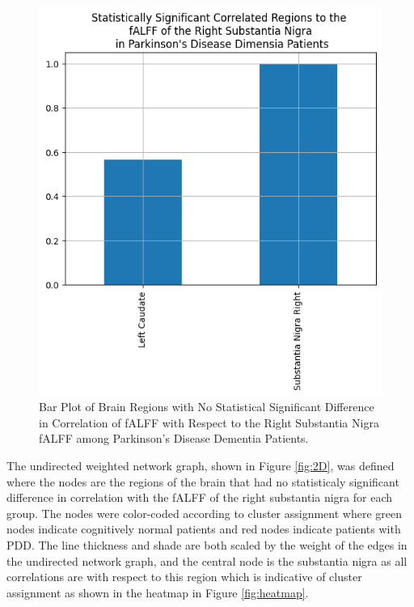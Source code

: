 \documentclass[12pt]{article}
\begin{document}
\begin{figure}[h]  %
    \centering
    \includegraphics[width=\textwidth]{"../img/statistically_significant_correlated_regions_sn_pdd.png"}  %
    \caption{Bar Plot of Brain Regions with No Statistical Significant Difference in Correlation of fALFF with Respect to the Right Substantia Nigra fALFF among Parkinson's Disease Dementia Patients.}
    \label{fig:pdd}  %
\end{figure}

\FloatBarrier

The undirected weighted network graph, shown in Figure \ref{fig:2D}, was defined where the nodes are the regions of the brain that had no statisticaly significant difference in correlation with the fALFF of the right substantia nigra for each group. The nodes were color-coded according to cluster assignment where green nodes indicate cognitively normal patients and red nodes indicate patients with PDD. The line thickness and shade are both scaled by the weight of the edges in the undirected network graph, and the central node is the substantia nigra as all correlations are with respect to this region which is indicative of cluster assignment as shown in the heatmap in Figure \ref{fig:heatmap}.
\end{document}

